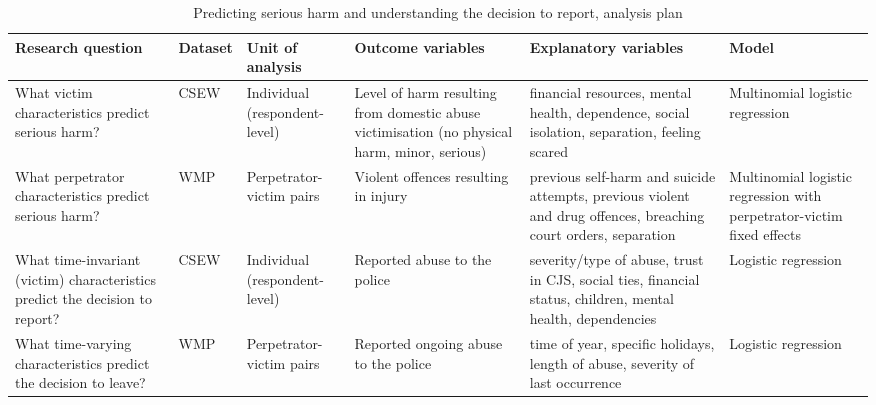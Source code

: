 \documentclass[11pt, a4paper]{article}
\begin{document}
\begin{table}[!htbp]
\caption{Predicting serious harm and understanding the decision to report, analysis plan}
  \begin{threeparttable}[t]
  \centering
       \begin{tabular}{ L{2.8cm}  C{1.8cm}  C{1.8cm}  C{3.2cm}  C{2.8cm}  C{2cm} }
    \toprule
     \textbf{Research question} & \textbf{Dataset}    & \textbf{Unit of analysis} & \textbf{Outcome variables} & \textbf{Explanatory variables} & \textbf{Model} \\
    \midrule
    What victim characteristics predict serious harm? & CSEW & Individual (respondent-level) & Level of harm resulting from domestic abuse victimisation (no physical harm, minor, serious) & financial resources, mental health, dependence, social isolation, separation, feeling scared & Multinomial logistic regression \\
                \midrule
                    What perpetrator characteristics predict serious harm? & WMP & Perpetrator-victim pairs & Violent offences resulting in injury & previous self-harm and suicide attempts, previous violent and drug offences, breaching court orders, separation & Multinomial logistic regression with perpetrator-victim fixed effects \\
                \midrule
     What time-invariant (victim) characteristics predict the decision to report? & CSEW & Individual (respondent-level) & Reported abuse to the police & severity/type of abuse, trust in CJS, social ties, financial status, children, mental health, dependencies & Logistic regression \\
       \midrule
          What time-varying characteristics predict the decision to leave? & WMP & Perpetrator-victim pairs & Reported ongoing abuse to the police & time of year, specific holidays, length of abuse, severity of last occurrence & Logistic regression \\
     \bottomrule
  \end{tabular}
    \end{threeparttable}%
  \label{tab:addlabel}%
\end{table}%


\end{document}
